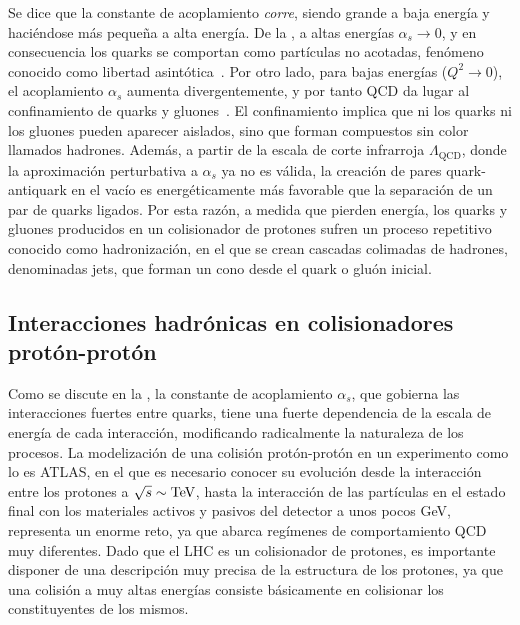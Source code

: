 Se dice que la constante de acoplamiento \textit{corre}, siendo grande a baja energía y haciéndose más pequeña a alta energía. De la \Eqn{\ref{eq:theory:sm:mathematical:qcd:alphas}}, a altas energías \(\alpha_s \to 0\), y en consecuencia los quarks se comportan como partículas no acotadas, fenómeno conocido como libertad asintótica~\cite{Wilczek_Gross-1973,Politzer-1973}.
Por otro lado, para bajas energías (\(Q^2 \to 0\)), el acoplamiento \(\alpha_s\) aumenta divergentemente, y por tanto \ac{QCD} da lugar al confinamiento de quarks y gluones~\cite{Glashow_Georgi-1974}. El confinamiento implica que ni los quarks ni los gluones pueden aparecer aislados, sino que forman compuestos sin color llamados hadrones.
Además, a partir de la escala de corte infrarroja \(\Lambda_{\text{QCD}}\), donde la aproximación perturbativa a \(\alpha_s\) ya no es válida, la creación de pares quark-antiquark en el vacío es energéticamente más favorable que la separación de un par de quarks ligados. Por esta razón, a medida que pierden energía, los quarks y gluones producidos en un colisionador de protones sufren un proceso repetitivo conocido como hadronización, en el que se crean cascadas colimadas de hadrones, denominadas jets, que forman un cono desde el quark o gluón inicial.


\subsection{Interacciones hadr\'onicas en colisionadores prot\'on-prot\'on}
\label{subsec:theory:sm:hadron_interactions}

Como se discute en la \Sect{\ref{subsubsec:theory:sm:mathematical:qcd}}, la constante de acoplamiento \(\alpha_s\), que gobierna las interacciones fuertes entre quarks, tiene una fuerte dependencia de la escala de energía de cada interacción, modificando radicalmente la naturaleza de los procesos. La modelización de una colisión protón-protón en un experimento como lo es \ac{ATLAS}, en el que es necesario conocer su evolución desde la interacción entre los protones a \(\sqrt{s} \sim \text{TeV}\), hasta la interacción de las partículas en el estado final con los materiales activos y pasivos del detector a unos pocos GeV, representa un enorme reto, ya que abarca regímenes de comportamiento \ac{QCD} muy diferentes. Dado que el \ac{LHC} es un colisionador de protones, es importante disponer de una descripción muy precisa de la estructura de los protones, ya que una colisión \pp a muy altas energías consiste básicamente en colisionar los constituyentes de los mismos.

